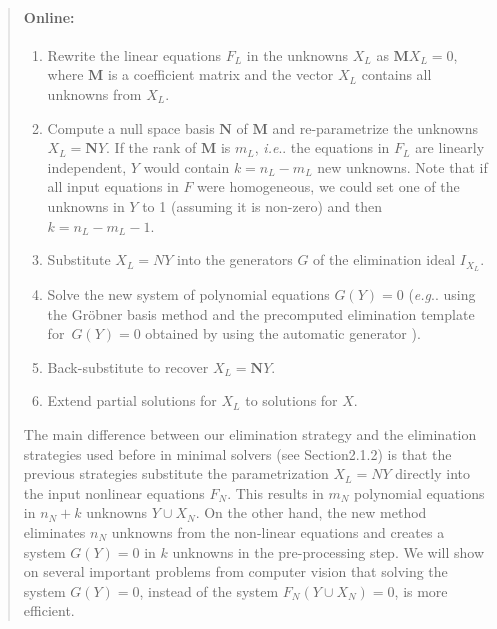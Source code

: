 \documentclass[11pt,a4paper]{article}
\makeatletter
\theoremstyle{definition}
\newcommand{\mat}[1]{\bm{#1}}
\DeclareRobustCommand\eg{\emph{e.g}\@ifnextchar.{}{.\@}}
\DeclareRobustCommand\ie{\emph{i.e}\@ifnextchar.{}{.\@}}
\makeatother
\begin{document}
\begin{quote}
\paragraph{Online:}
\begin{enumerate}[resume]
    \item Rewrite the linear equations $F_L$ in the unknowns $X_L$ as $\mat{M}X_L= 0$, where $\mat{M}$
    is a coefficient matrix and the vector $X_L$ contains all unknowns from $X_L$.
    \item Compute a null space basis $\mat{N}$ of $\mat{M}$ and re-parametrize the unknowns $X_L=\mat{N}Y$. If the
    rank of $\mat{M}$ is $m_L$, \ie{} the equations in $F_L$ are linearly independent, $Y$ would contain
    $k=n_L - m_L$ new unknowns. Note that if all input equations in $F$ were homogeneous, we could
    set one of the unknowns in $Y$ to 1 (assuming it is non-zero) and then $k=n_L-m_L-1$.
    \item Substitute $X_L=NY$ into the generators $G$ of the elimination ideal $I_{X_L}$.
    \item Solve the new system of polynomial equations $G(Y) = 0$ (\eg{} using the Gröbner basis
    method and the precomputed elimination template for~\mbox{$G(Y) = 0$} obtained by using the automatic
    generator \cite{kukelova2008}).
    \item Back-substitute to recover $X_L=\mat{N}Y$.
    \item Extend partial solutions for $X_L$ to solutions for $X$.
\end{enumerate}
The main difference between our elimination strategy and the elimination strategies used before in
minimal solvers (see Section2.1.2) is that the previous strategies substitute the parametrization
$X_L=NY$ directly into the input nonlinear equations $F_N$. This results in $m_N$ polynomial
equations in $n_N+k$ unknowns $Y\cup X_N$. On the other hand, the new method eliminates
$n_N$ unknowns from the non-linear equations and creates a system $G(Y) = 0$ in $k$ unknowns in the
pre-processing step. We will show on several important problems from computer vision that solving
the system $G(Y)  =  0$, instead of the system $F_N(Y\cup X_N) = 0$, is more efficient.
\end{quote}
\end{document}
